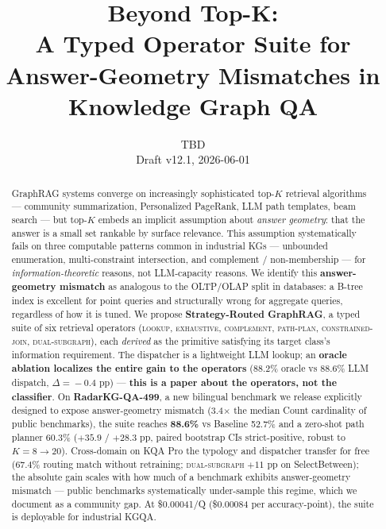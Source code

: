 \documentclass[10pt,a4paper,twocolumn]{article}
\title{Beyond Top-K: \\
A Typed Operator Suite for Answer-Geometry Mismatches in Knowledge Graph QA}
\author{TBD \\ \small{Draft v12.1, 2026-06-01}}
\date{}
\newcommand{\op}[1]{\textsc{\small #1}}
\begin{document}
\maketitle

\begin{abstract}
GraphRAG systems converge on increasingly sophisticated top-$K$ retrieval algorithms --- community summarization, Personalized PageRank, LLM path templates, beam search --- but top-$K$ embeds an implicit assumption about \emph{answer geometry}: that the answer is a small set rankable by surface relevance. This assumption systematically fails on three computable patterns common in industrial KGs --- unbounded enumeration, multi-constraint intersection, and complement / non-membership --- for \emph{information-theoretic} reasons, not LLM-capacity reasons. We identify this \textbf{answer-geometry mismatch} as analogous to the OLTP/OLAP split in databases: a B-tree index is excellent for point queries and structurally wrong for aggregate queries, regardless of how it is tuned. We propose \textbf{Strategy-Routed GraphRAG}, a typed suite of six retrieval operators (\op{lookup}, \op{exhaustive}, \op{complement}, \op{path-plan}, \op{constrained-join}, \op{dual-subgraph}), each \emph{derived} as the primitive satisfying its target class's information requirement. The dispatcher is a lightweight LLM lookup; an \textbf{oracle ablation localizes the entire gain to the operators} (88.2\% oracle vs 88.6\% LLM dispatch, $\Delta\!=\!-0.4$ pp) --- \textbf{this is a paper about the operators, not the classifier}. On \textbf{RadarKG-QA-499}, a new bilingual benchmark we release explicitly designed to expose answer-geometry mismatch (3.4$\times$ the median Count cardinality of public benchmarks), the suite reaches \textbf{88.6\%} vs Baseline 52.7\% and a zero-shot path planner 60.3\% ($+35.9$ / $+28.3$ pp, paired bootstrap CIs strict-positive, robust to $K{=}8{\to}20$). Cross-domain on KQA Pro the typology and dispatcher transfer for free (67.4\% routing match without retraining; \op{dual-subgraph} $+11$ pp on SelectBetween); the absolute gain scales with how much of a benchmark exhibits answer-geometry mismatch --- public benchmarks systematically under-sample this regime, which we document as a community gap. At \$0.00041/Q (\$0.00084 per accuracy-point), the suite is deployable for industrial KGQA.
\end{abstract}

\end{document}
